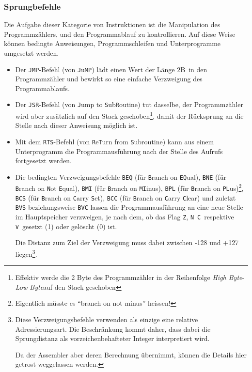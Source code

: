 \documentclass[11pt]{scrartcl}
\newcommand{\byte}{\unit{B}}
\newcommand{\nflag}{\texttt{N}}
\newcommand{\vflag}{\texttt{V}}
\newcommand{\zflag}{\texttt{Z}}
\newcommand{\cflag}{\texttt{C}}
\newcommand{\lobyte}{\emph{Low Byte}}
\newcommand{\hibyte}{\emph{High Byte}}
\begin{document}
\subsubsection{Sprungbefehle}
\label{sec:branch_instructions}

Die Aufgabe dieser Kategorie von Instruktionen ist die Manipulation
des Programmzählers, und den Programmablauf zu kontrollieren.
Auf diese Weise können bedingte Anweisungen,
Programmschleifen und Unterprogramme umgesetzt werden.

\begin{itemize}
\item Der \lstinline|JMP|-Befehl (von \texttt{J}u\texttt{MP}) lädt
  einen Wert der Länge 2\byte\ in den Programmzähler und bewirkt so
  eine einfache Verzweigung des Programmablaufs.
\item Der \lstinline|JSR|-Befehl (von \texttt{J}ump to
  \texttt{S}ub\texttt{R}outine) tut dasselbe, der Programmzähler wird aber
  zusätzlich auf den Stack geschoben\footnote{Effektiv werde die 2 Byte des
    Programmzähler in der Reihenfolge \hibyte-\lobyte auf den
    Stack geschoben}, damit der Rücksprung an die
  Stelle nach dieser Anweisung möglich ist.
\item Mit dem \lstinline|RTS|-Befehl (von \texttt{R}e\texttt{T}urn from
  \texttt{S}ubroutine) kann aus einem Unterprogramm die
  Programmausführung nach der Stelle des Aufrufs fortgesetzt werden.
\item Die bedingten Verzweigungsbefehle \lstinline|BEQ| (für
  \texttt{B}ranch on \texttt{EQ}ual), \lstinline|BNE| (für \texttt{B}ranch
  on \texttt{N}ot \texttt{E}qual), \lstinline|BMI| (für \texttt{B}ranch on
  \texttt{MI}inus), \lstinline|BPL| (für \texttt{B}ranch on
  \texttt{PL}us)\footnote{Eigentlich müsste es "`branch on not minus"'
    heissen!}, \lstinline|BCS| (für \texttt{B}ranch on \texttt{C}arry
  \texttt{S}et), \lstinline|BCC| (für \texttt{B}ranch on \texttt{C}arry
  \texttt{C}lear) und zuletzt \lstinline!BVS! beziehungsweise
  \lstinline!BVC! lassen die Programmausführung an eine neue Stelle im
  Hauptspeicher verzweigen, je nach dem, ob das Flag \zflag, \nflag\,
  \cflag\ respektive \vflag\ gesetzt (1) oder gelöscht (0) ist.

  Die Distanz zum Ziel der Verzweigung muss dabei zwischen -128 und
  +127 liegen\footnote{Diese Verzweigungsbefehle verwenden als einzige
    eine relative Adressierungsart. Die Beschränkung kommt daher, dass
    dabei die Sprungdistanz als vorzeichenbehafteter Integer interpretiert
    wird.

    Da der Assembler aber deren Berechnung übernimmt, können die
    Details hier getrost weggelassen werden.}.
\end{itemize}
\end{document}

